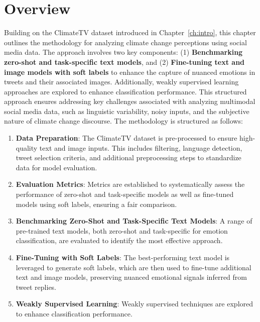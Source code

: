 \section{Overview}

Building on the ClimateTV dataset introduced in Chapter~\ref{ch:intro}, this chapter outlines the methodology for analyzing climate change perceptions using social media data. The approach involves two key components: (1) \textbf{Benchmarking zero-shot and task-specific text models}, and (2) \textbf{Fine-tuning text and image models with soft labels} to enhance the capture of nuanced emotions in tweets and their associated images. Additionally, weakly supervised learning approaches are explored to enhance classification performance. This structured approach ensures addressing key challenges associated with analyzing multimodal social media data, such as linguistic variability, noisy inputs, and the subjective nature of climate change discourse. The methodology is structured as follows:

\begin{enumerate}
    \item \textbf{Data Preparation}: The ClimateTV dataset is pre-processed to ensure high-quality text and image inputs. This includes filtering, language detection, tweet selection criteria, and additional preprocessing steps to standardize data for model evaluation.
    
    \item \textbf{Evaluation Metrics}: Metrics are established to systematically assess the performance of zero-shot and task-specific models as well as fine-tuned models using soft labels, ensuring a fair comparison.
    
    \item \textbf{Benchmarking Zero-Shot and Task-Specific Text Models}: A range of pre-trained text models, both zero-shot and task-specific for emotion classification, are evaluated to identify the most effective approach.
    
    \item \textbf{Fine-Tuning with Soft Labels}: The best-performing text model is leveraged to generate soft labels, which are then used to fine-tune additional text and image models, preserving nuanced emotional signals inferred from tweet replies.
    
    \item \textbf{Weakly Supervised Learning}: Weakly supervised techniques are explored to enhance classification performance.
\end{enumerate}


